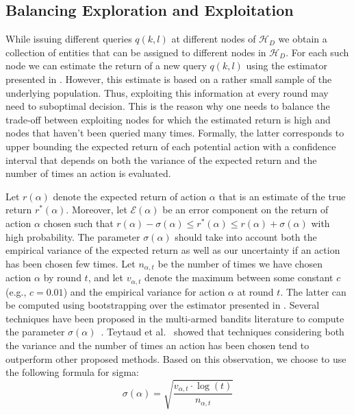 \documentclass{vldb}
\newcommand{\hierarchy}{\mathcal{H}_D}
\begin{document}
\subsection{Balancing Exploration and Exploitation}
While issuing different queries $q(k,l)$ at different nodes of $\hierarchy$ we obtain a collection of entities that can be assigned to different nodes in $\hierarchy$. For each such node we can estimate the return of a new query $q(k,l)$ using the estimator presented in . However, this estimate is based on a rather small sample of the underlying population. Thus, exploiting this information at every round may need to suboptimal decision. This is the reason why one needs to balance the trade-off between exploiting nodes for which the estimated return is high and nodes that haven't been queried many times. Formally, the latter corresponds to upper bounding the expected return of each potential action with a confidence interval that depends on both the variance of the expected return and the number of times an action is evaluated.

Let $r(\alpha)$ denote the expected return of action $\alpha$ that is an estimate of the true return $r^*(\alpha)$. Moreover, let $\mathcal{E}(\alpha)$ be an error component on the return of action $\alpha$ chosen such that $r(\alpha) - \sigma(\alpha) \leq r^*(\alpha) \leq r(\alpha) + \sigma(\alpha)$ with high probability. The parameter $\sigma(\alpha)$ should take into account both the empirical variance of the expected return as well as our uncertainty if an action has been chosen few times. Let $n_{\alpha,t}$ be the number of times we have chosen action $\alpha$ by round $t$, and let $v_{\alpha,t}$ denote the maximum between some constant $c$ (e.g., $c = 0.01$) and the empirical variance for action $\alpha$ at round $t$. The latter can be computed using bootstrapping over the estimator presented in . Several techniques have been proposed in the multi-armed bandits literature to compute the parameter $\sigma(\alpha)$~\cite{teytaud:inria-00173263}. Teytaud et al.~\cite{teytaud:inria-00173263} showed that techniques considering both the variance and the number of times an action has been chosen tend to outperform other proposed methods. Based on this observation, we choose to use the following formula for sigma:
\begin{equation}
\label{eq:upper}
\sigma(\alpha) = \sqrt{\frac{v_{\alpha,t}\cdot\log(t)}{n_{\alpha,t}}}
\end{equation}
\end{document}
